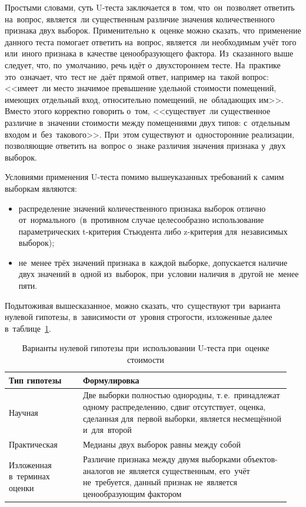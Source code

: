 \documentclass[]{scrreprt}
\begin{document}
Простыми словами, суть U-теста заключается в~том, что~он~позволяет ответить на~вопрос, является~ли существенным различие значения количественного признака двух выборок. Применительно к~оценке можно сказать, что~применение данного теста помогает ответить на~вопрос, является~ли необходимым учёт того или~иного признака в~качестве ценообразующего фактора. Из~сказанного выше следует, что, по~умолчанию, речь идёт о~двухстороннем тесте. На~практике это~означает, что~тест не~даёт прямой ответ, например на~такой вопрос: <<имеет~ли место значимое превышение удельной стоимости помещений, имеющих отдельный вход, относительно помещений, не~обладающих им>>. Вместо этого корректно говорить о~том, <<существует~ли существенное различие в~значении стоимости между помещениями двух типов: с~отдельным входом и~без~такового>>. При~этом существуют и~односторонние реализации, позволяющие ответить на~вопрос о~знаке различия значения признака у~двух выборок.

Условиями применения U-теста помимо вышеуказанных требований к~самим выборкам являются:
\begin{itemize}
	\item распределение значений количественного признака выборок отлично от~нормального~(в~противном случае целесообразно использование параметрических t-критерия Стьюдента либо z-критерия для~независимых выборок);
	\item не~менее трёх значений признака в~каждой выборке, допускается наличие двух значений в~одной из~выборок, при~условии наличия в~другой не~менее пяти.
	\end{itemize}
Подытоживая вышесказанное, можно сказать, что~существуют три~варианта нулевой гипотезы, в~зависимости от~уровня строгости, изложенные далее в~таблице~\ref{tab:nul-hypothesis-variants}.
\begin{table}[ht]
	\caption{Варианты нулевой гипотезы при~использовании U-теста при~оценке стоимости}  \label{tab:nul-hypothesis-variants}
	\centering
	\begin{tabularx}{\textwidth}{p{0.25\linewidth} p{0.7\linewidth}} 
		\hline
		Тип гипотезы&Формулировка\\
		 \hline
		Научная&Две выборки полностью однородны, т.\,е.~принадлежат одному распределению, сдвиг отсутствует, оценка, сделанная для~первой выборки, является несмещённой и~для~второй\\
		 \hline
		Практическая&Медианы двух выборок равны между собой\\
		 \hline
		Изложенная в~терминах оценки&Различие признака между двумя выборками объектов-аналогов не~является существенным, его~учёт не~требуется, данный признак не~является ценообразующим фактором\\ \hline
	\end{tabularx}
\end{table}
\end{document}
